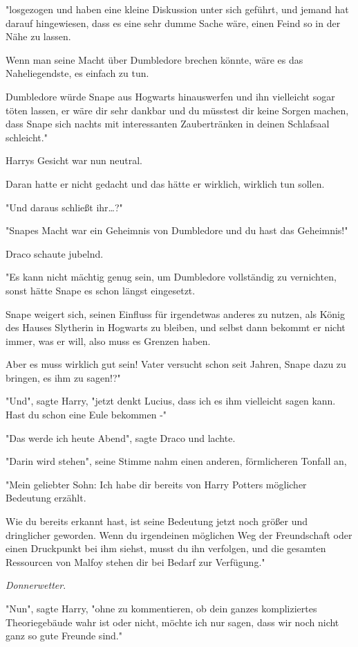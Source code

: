 {"losgezogen und haben eine kleine Diskussion unter sich geführt, und jemand hat darauf hingewiesen, dass es eine sehr dumme Sache wäre, einen Feind so in der Nähe zu lassen.

Wenn man seine Macht über Dumbledore brechen könnte, wäre es das Naheliegendste, es einfach zu tun.

Dumbledore würde Snape aus Hogwarts hinauswerfen und ihn vielleicht sogar töten lassen, er wäre dir sehr dankbar und du müsstest dir keine Sorgen machen, dass Snape sich nachts mit interessanten Zaubertränken in deinen Schlafsaal schleicht."

Harrys Gesicht war nun neutral.

Daran hatte er nicht gedacht und das hätte er wirklich, wirklich tun sollen.

"Und daraus schließt ihr…?"

"Snapes Macht war ein Geheimnis von Dumbledore und du hast das Geheimnis!"

Draco schaute jubelnd.

"Es kann nicht mächtig genug sein, um Dumbledore vollständig zu vernichten, sonst hätte Snape es schon längst eingesetzt.

Snape weigert sich, seinen Einfluss für irgendetwas anderes zu nutzen, als König des Hauses Slytherin in Hogwarts zu bleiben, und selbst dann bekommt er nicht immer, was er will, also muss es Grenzen haben.

Aber es muss wirklich gut sein! Vater versucht schon seit Jahren, Snape dazu zu bringen, es ihm zu sagen!?"

"Und", sagte Harry, "jetzt denkt Lucius, dass ich es ihm vielleicht sagen kann. Hast du schon eine Eule bekommen -"

"Das werde ich heute Abend", sagte Draco und lachte.

"Darin wird stehen", seine Stimme nahm einen anderen, förmlicheren Tonfall an,

"Mein geliebter Sohn: Ich habe dir bereits von Harry Potters möglicher Bedeutung erzählt.

Wie du bereits erkannt hast, ist seine Bedeutung jetzt noch größer und dringlicher geworden. Wenn du irgendeinen möglichen Weg der Freundschaft oder einen Druckpunkt bei ihm siehst, musst du ihn verfolgen, und die gesamten Ressourcen von Malfoy stehen dir bei Bedarf zur Verfügung."

\emph{Donnerwetter}.

"Nun", sagte Harry, "ohne zu kommentieren, ob dein ganzes kompliziertes Theoriegebäude wahr ist oder nicht, möchte ich nur sagen, dass wir noch nicht ganz so gute Freunde sind."

}
